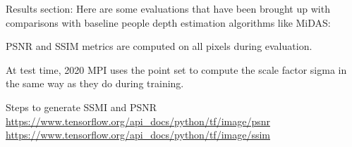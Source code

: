 Results section:
Here are some evaluations that have been brought up with comparisons with baseline people depth estimation algorithms like MiDAS:

PSNR and SSIM metrics are computed on all pixels during evaluation.

At test time, 2020 MPI uses the point set to compute the scale factor sigma in the same way as they do
during training.

Steps to generate SSMI and PSNR
\cite{wang_ssmi_psnr}
\url{https://www.tensorflow.org/api_docs/python/tf/image/psnr}
\url{https://www.tensorflow.org/api_docs/python/tf/image/ssim}


    
  
    
    
    

    
    
